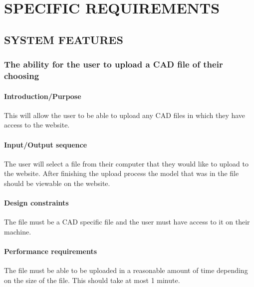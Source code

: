 \documentclass[letterpaper, 10pt, draftclsnofoot, compsoc, onecolumn]{IEEEtran}
\begin{document}
\section[SPECIFIC
REQUIREMENTS]{\rmfamily\bfseries\color{black}
SPECIFIC REQUIREMENTS}
\bigskip

\subsection[SYSTEM
FEATURES]{\rmfamily\bfseries\color{black}
SYSTEM FEATURES}
\medskip


\subsubsection[{File Uploading}]{\rmfamily\bfseries\color{black}
	The ability for the user to upload a CAD file of their choosing
}

\paragraph[Introduction/Purpose of this
feature]{\rmfamily\bfseries\color{black}
Introduction/Purpose }
{\color{black}
	This will allow the user to be able to upload any CAD files in which they have access to the website.
}

\paragraph[Input/Output sequence:]{\rmfamily\bfseries\color{black}
Input/Output sequence }
{\color{black}
	The user will select a file from their computer that they would like to upload to the website. After finishing the upload process 
	the model that was in the file should be viewable on the website. 
}

\paragraph[Design constraints of this
feature]{\rmfamily\bfseries\color{black} Design
constraints }
{\color{black}
	The file must be a CAD specific file and the user must have access to it on their machine. 
}

\paragraph[Performance requirements of this
feature]{\rmfamily\bfseries\color{black}
Performance requirements }
{\color{black}
	The file must be able to be uploaded in a reasonable amount of time depending on the size of the file. This should take at 
	most 1 minute. 
}
\end{document}
